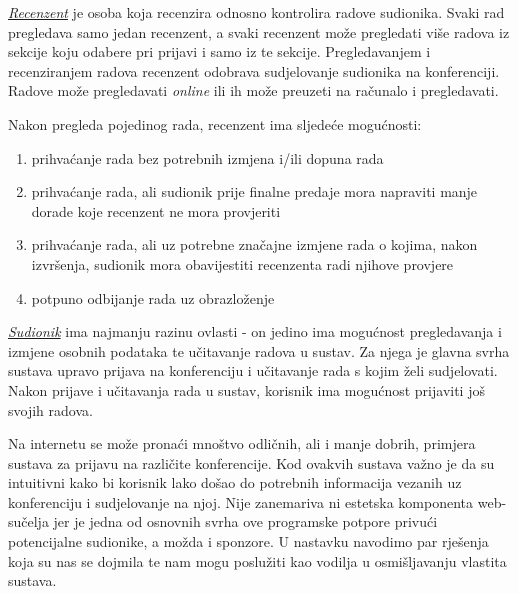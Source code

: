 		
		\underline{\textit{Recenzent}} je osoba koja recenzira odnosno kontrolira radove sudionika. Svaki rad pregledava samo jedan recenzent, a svaki recenzent može pregledati više radova iz sekcije koju odabere pri prijavi i samo iz te sekcije. Pregledavanjem i recenziranjem radova recenzent odobrava sudjelovanje sudionika na konferenciji. Radove može pregledavati \textit{online} ili ih može preuzeti na računalo i pregledavati. 
		
		Nakon pregleda pojedinog rada, recenzent ima sljedeće mogućnosti:
		
		\begin{enumerate}
			
			\item prihvaćanje rada bez potrebnih izmjena i/ili dopuna rada
			\item prihvaćanje rada, ali sudionik prije finalne predaje mora napraviti manje dorade koje recenzent ne mora provjeriti
			\item prihvaćanje rada, ali uz potrebne značajne izmjene rada o kojima, nakon izvršenja, sudionik mora obavijestiti recenzenta radi njihove provjere
			\item potpuno odbijanje rada uz obrazloženje
			
		\end{enumerate}
	
		\underline{\textit{Sudionik}} ima najmanju razinu ovlasti - on jedino ima mogućnost pregledavanja i izmjene osobnih podataka te učitavanje radova u sustav. Za njega je glavna svrha sustava upravo prijava na konferenciju i učitavanje rada s kojim želi sudjelovati. Nakon prijave i učitavanja rada u sustav, korisnik ima mogućnost prijaviti još svojih radova.
		
		Na internetu se može pronaći mnoštvo odličnih, ali i manje dobrih, primjera sustava za prijavu na različite konferencije. Kod ovakvih sustava važno je da su intuitivni kako bi korisnik lako došao do potrebnih informacija vezanih uz konferenciju i sudjelovanje na njoj. Nije zanemariva ni estetska komponenta web-sučelja jer je jedna od osnovnih svrha ove programske potpore privući potencijalne sudionike, a možda i sponzore. U nastavku navodimo par rješenja koja su nas se dojmila te nam mogu poslužiti kao vodilja u osmišljavanju vlastita sustava.
	
		\eject
		
	